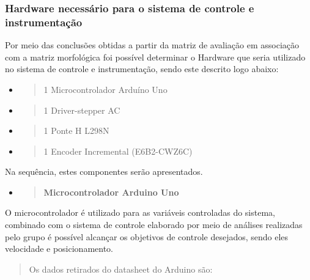 \documentclass[]{article}
\begin{document}
\subsubsection{Hardware necessário para o sistema de controle e
instrumentação}\label{hardware-necessuxe1rio-para-o-sistema-de-controle-e-instrumentauxe7uxe3o}

Por meio das conclusões obtidas a partir da matriz de avaliação em
associação com a matriz morfológica foi possível determinar o Hardware
que seria utilizado no sistema de controle e instrumentação, sendo este
descrito logo abaixo:

\begin{itemize}
\item
  \begin{quote}
  1 Microcontrolador Arduíno Uno
  \end{quote}
\item
  \begin{quote}
  1 Driver-stepper AC
  \end{quote}
\item
  \begin{quote}
  1 Ponte H L298N
  \end{quote}
\item
  \begin{quote}
  1 Encoder Incremental (E6B2-CWZ6C)
  \end{quote}
\end{itemize}

Na sequência, estes componentes serão apresentados.

\begin{itemize}
\item
  \begin{quote}
  \textbf{Microcontrolador Arduino Uno}
  \end{quote}
\end{itemize}

O microcontrolador é utilizado para as variáveis controladas do sistema,
combinado com o sistema de controle elaborado por meio de análises
realizadas pelo grupo é possível alcançar os objetivos de controle
desejados, sendo eles velocidade e posicionamento.

\begin{quote}
Os dados retirados do datasheet do Arduino são:
\end{quote}
\end{document}
